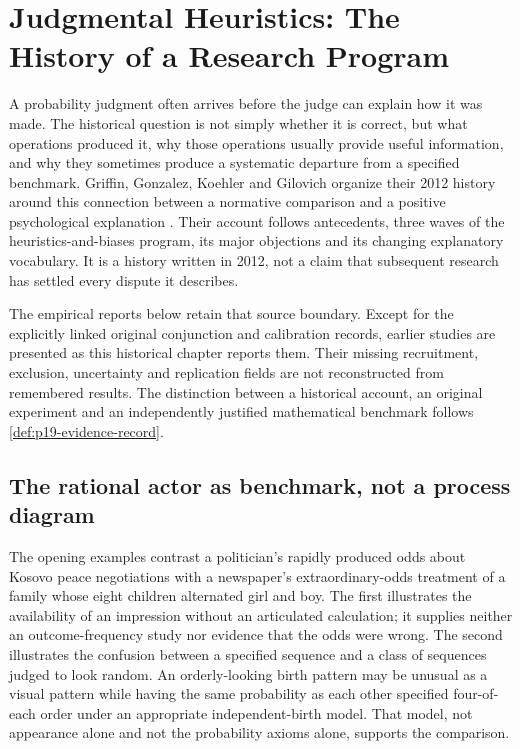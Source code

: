 \chapter{Judgmental Heuristics: The History of a Research Program}
\label{sec:p19-heuristics-program-history}

A probability judgment often arrives before the judge can explain how it
was made. The historical question is not simply whether it is correct, but
what operations produced it, why those operations usually provide useful
information, and why they sometimes produce a systematic departure from a
specified benchmark. Griffin, Gonzalez, Koehler and Gilovich organize their
2012 history around this connection between a normative comparison and a
positive psychological explanation
\cite[pp.~322--345]{GriffinEtAl2012HeuristicsHistory}.
Their account follows antecedents, three waves of the heuristics-and-biases
program, its major objections and its changing explanatory vocabulary.
It is a history written in 2012, not a claim that subsequent research has
settled every dispute it describes.

The empirical reports below retain that source boundary. Except for the
explicitly linked original conjunction and calibration records, earlier
studies are presented as this historical chapter reports them. Their
missing recruitment, exclusion, uncertainty and replication fields are
not reconstructed from remembered results. The distinction between a
historical account, an original experiment and an independently justified
mathematical benchmark follows \cref{def:p19-evidence-record}.

\section{The rational actor as benchmark, not a process diagram}
\label{sec:p19-hph-rational-actor}

The opening examples contrast a politician's rapidly produced odds about
Kosovo peace negotiations with a newspaper's extraordinary-odds treatment
of a family whose eight children alternated girl and boy. The first
illustrates the availability of an impression without an articulated
calculation; it supplies neither an outcome-frequency study nor evidence
that the odds were wrong. The second illustrates the confusion between a
specified sequence and a class of sequences judged to look random.
An orderly-looking birth pattern may be unusual as a visual pattern while
having the same probability as each other specified four-of-each order
under an appropriate independent-birth model. That model, not appearance
alone and not the probability axioms alone, supports the comparison.

